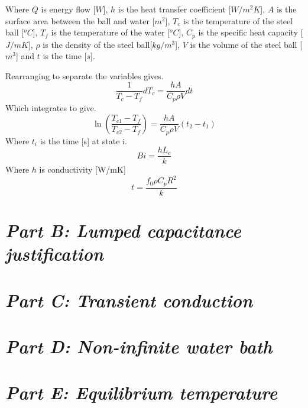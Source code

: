 \documentclass[11pt]{article}
\begin{document}
Where $\stackrel{.}{Q}$ is energy flow [$W$], $h$ is the heat transfer coefficient [$W/m^{2}K$], $A$ is the surface area between the ball and water [$m^{2}$], $T_{c}$ is the temperature of the steel ball [$^{o}C$], $T_{f}$ is the temperature of the water [$^{o}C$], $C_{p}$ is the specific heat capacity [$J/mK$], $\rho$ is the density of the steel ball[$kg/m^{3}$], $V$ is the volume of the steel ball [$m^3$] and $t$ is the time [$s$].
\newline

Rearranging to separate the variables gives.
\begin{equation}\label{key}
	\frac{1}{T_{c}-T_{f}} dT_{c} = \frac{hA}{C_{p}\rho V}dt
\end{equation}
Which integrates to give.
\begin{equation}\label{key}
	\ln{(\frac{T_{c1}-T_{f}}{T_{c2}-T_{f}})} =  \frac{hA}{C_{p}\rho V}(t_{2}-t_{1})
\end{equation}
Where $t_{i}$ is the time [s] at state i.
\begin{equation}
	Bi = \frac{h L_{c}}{k}
\end{equation}
Where $h$ is conductivity [W/mK]
\begin{equation}
	t=\frac{f_{0} \rho C_{p} R^{2}}{k}
\end{equation}
\section{\emph{Part B: Lumped capacitance justification}}

\section{\emph{Part C: Transient conduction}}

\section{\emph{Part D: Non-infinite water bath}}

\section{\emph{Part E: Equilibrium temperature}}
\end{document}
